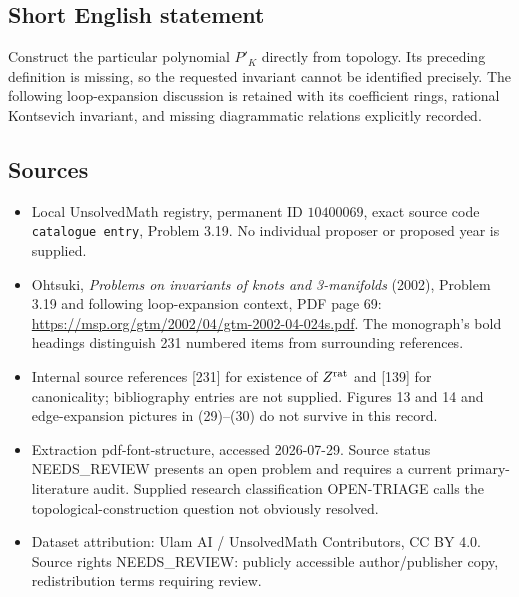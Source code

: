 \documentclass[11pt]{article}
\begin{document}
\subsection{Short English statement}
Construct the particular polynomial \(P'_K\) directly from topology. Its preceding definition is missing, so the requested invariant cannot be identified precisely. The following loop-expansion discussion is retained with its coefficient rings, rational Kontsevich invariant, and missing diagrammatic relations explicitly recorded.
\subsection{Sources}
\begin{itemize}
\item Local UnsolvedMath registry, permanent ID \(10400069\), exact source code \texttt{catalogue entry}, Problem 3.19. No individual proposer or proposed year is supplied.
\item Ohtsuki, \emph{Problems on invariants of knots and 3-manifolds} (2002), Problem 3.19 and following loop-expansion context, PDF page 69: \url{https://msp.org/gtm/2002/04/gtm-2002-04-024s.pdf}. The monograph's bold headings distinguish 231 numbered items from surrounding references.
\item Internal source references [231] for existence of \(Z^{\rm rat}\) and [139] for canonicality; bibliography entries are not supplied. Figures 13 and 14 and edge-expansion pictures in (29)--(30) do not survive in this record.
\item Extraction pdf-font-structure, accessed 2026-07-29. Source status NEEDS\_REVIEW presents an open problem and requires a current primary-literature audit. Supplied research classification OPEN-TRIAGE calls the topological-construction question not obviously resolved.
\item Dataset attribution: Ulam AI / UnsolvedMath Contributors, CC BY 4.0. Source rights NEEDS\_REVIEW: publicly accessible author/publisher copy, redistribution terms requiring review.
\end{itemize}
\end{document}
